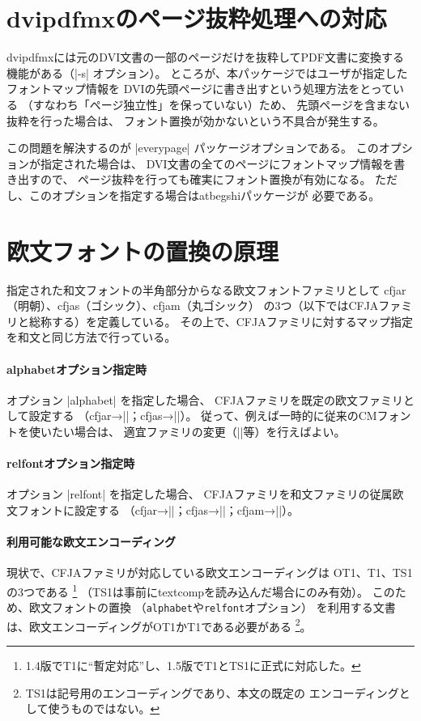 \documentclass[uplatex,dvipdfmx,a4paper]{jsarticle}
\newcommand{\Pkg}[1]{\textsf{#1}}
\providecommand{\Strong}[1]{\textsf{#1}}
\begin{document}
\section{dvipdfmxのページ抜粋処理への対応}
\label{sec:PageSelection}

dvipdfmxには元のDVI文書の一部のページだけを抜粋してPDF文書に変換する
機能がある（|-s| オプション）。
ところが、本パッケージではユーザが指定したフォントマップ情報を
DVIの先頭ページに書き出すという処理方法をとっている
（すなわち「ページ独立性」を保っていない）ため、
先頭ページを含まない抜粋を行った場合は、
フォント置換が効かないという不具合が発生する。

この問題を解決するのが |everypage| パッケージオプションである。
このオプションが指定された場合は、
DVI文書の全てのページにフォントマップ情報を書き出すので、
ページ抜粋を行っても確実にフォント置換が有効になる。
ただし、このオプションを指定する場合は\Pkg{atbegshi}パッケージが
必要である。

\section{欧文フォントの置換の原理}
\label{sec:Mechanism-Alph}

指定された和文フォントの半角部分からなる欧文フォントファミリとして
cfjar（明朝）、cfjas（ゴシック）、cfjam（丸ゴシック）
の3つ（以下では\Strong{CFJAファミリ}と総称する）を定義している。
その上で、CFJAファミリに対するマップ指定を和文と同じ方法で行っている。

\paragraph{alphabetオプション指定時}
オプション |alphabet| を指定した場合、
CFJAファミリを既定の欧文ファミリとして設定する
（cfjar→|\rmdefault|；cfjas→|\sfdefault|）。
従って、例えば一時的に従来のCMフォントを使いたい場合は、
適宜ファミリの変更（||等）を行えばよい。

\paragraph{relfontオプション指定時}
オプション |relfont| を指定した場合、
CFJAファミリを和文ファミリの従属欧文フォントに設定する
（cfjar→|\mcfamily|；cfjas→|\gtfamily|；cfjam→|\mgfamily|）。

\paragraph{利用可能な欧文エンコーディング}
現状で、CFJAファミリが対応している欧文エンコーディングは
OT1、T1、TS1の3つである
\footnote{1.4版でT1に“暫定対応”し、1.5版でT1とTS1に正式に対応した。}%
（TS1は事前に\Pkg{textcomp}を読み込んだ場合にのみ有効）。
このため、欧文フォントの置換
（\texttt{alphabet}や\texttt{relfont}オプション）
を利用する文書は、欧文エンコーディングがOT1かT1である必要がある
\footnote{TS1は記号用のエンコーディングであり、本文の既定の
エンコーディングとして使うものではない。}。
\end{document}
